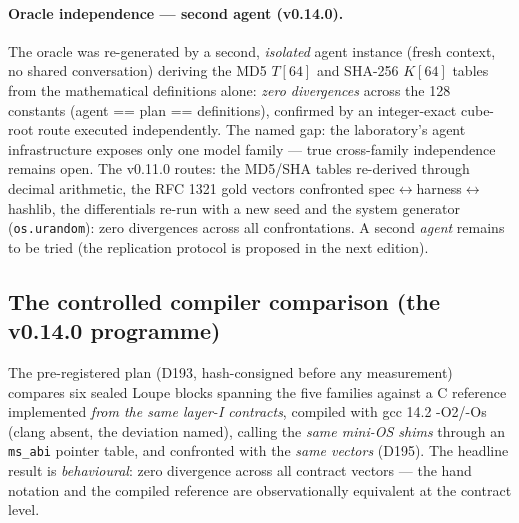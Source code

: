 \documentclass[11pt,a4paper]{article}
\newcommand{\code}[1]{\texttt{\small #1}}
\begin{document}
\paragraph{Oracle independence --- second agent (v0.14.0).} The oracle was
re-generated by a second, \emph{isolated} agent instance (fresh context,
no shared conversation) deriving the MD5 $T[64]$ and SHA-256 $K[64]$
tables from the mathematical definitions alone: \emph{zero divergences}
across the 128 constants (agent == plan == definitions), confirmed by an
integer-exact cube-root route executed independently. The named gap:
the laboratory's agent infrastructure exposes only one model family ---
true cross-family independence remains open. The v0.11.0 routes: the
MD5/SHA tables re-derived
through decimal arithmetic, the RFC 1321 gold vectors confronted
spec$\leftrightarrow$\allowbreak harness$\leftrightarrow$\allowbreak hashlib, the differentials
re-run with a new seed and the system generator (\code{os.urandom}):
zero divergences across all confrontations. A second \emph{agent} remains
to be tried (the replication protocol is proposed in the next edition).

\subsection{The controlled compiler comparison (the v0.14.0 programme)}\label{sec:comparaison}

The pre-registered plan (D193, hash-consigned before any measurement)
compares six sealed Loupe blocks spanning the five families against a C
reference implemented \emph{from the same layer-I contracts}, compiled
with gcc 14.2 -O2/-Os (clang absent, the deviation named), calling the
\emph{same mini-OS shims} through an \code{ms\_abi} pointer table, and
confronted with the \emph{same vectors} (D195). The headline result is
\emph{behavioural}: zero divergence across all contract vectors ---
the hand notation and the compiled reference are observationally
equivalent at the contract level.
\end{document}
